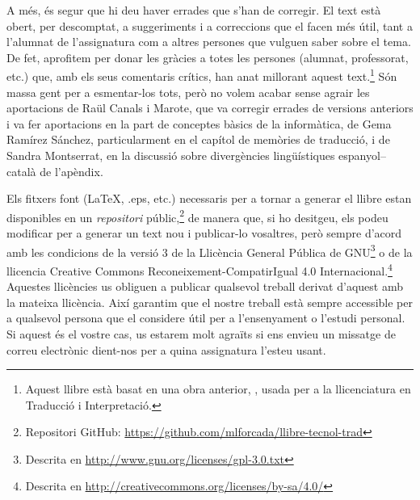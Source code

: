 A més, és segur que hi deu haver errades que s'han de corregir. El
text està obert, per descomptat, a suggeriments i a correccions que el
facen més útil, tant a l'alumnat de l'assignatura com a altres
persones que vulguen saber sobre el tema.  De fet, aprofitem per donar
les gràcies a totes les persones (alumnat, professorat, etc.)  que,
amb els seus comentaris crítics, han anat millorant aquest
text.\footnote{Aquest llibre està basat en una obra anterior,
  \protect\citep{forcada09b}, usada per a la llicenciatura en
  Traducció i Interpretació.}  Són massa gent per a esmentar-los tots,
però no volem acabar sense agrair les aportacions de Raül Canals i
Marote, que va corregir errades de versions anteriors i va fer
aportacions en la part de conceptes bàsics de la informàtica, de Gema
Ramírez Sánchez, particularment en el capítol de memòries de
traducció, i de Sandra Montserrat, en la discussió sobre divergències
lingüístiques espanyol--català de l'apèndix.


Els fitxers font (\LaTeX, .eps, etc.) necessaris per a tornar
a generar el llibre estan disponibles en un \emph{repositori} públic,\footnote{Repositori GitHub: \url{https://github.com/mlforcada/llibre-tecnol-trad}} de manera que, si ho desitgeu, els podeu
modificar per a generar un text nou i publicar-lo vosaltres, però
sempre d'acord amb les condicions de la versió 3 de la Llicència General Pública de
GNU\footnote{Descrita en
\url{http://www.gnu.org/licenses/gpl-3.0.txt}} o de la llicencia
Creative Commons Reconeixement-CompatirIgual 4.0 Internacional.\footnote{Descrita en
\url{http://creativecommons.org/licenses/by-sa/4.0/}} Aquestes
llicències us obliguen a publicar qualsevol treball
derivat d'aquest amb la mateixa llicència. Així garantim que el nostre
treball està sempre accessible per a qualsevol persona que el
considere útil per a l'ensenyament o l'estudi personal. Si aquest és el vostre cas,
us estarem molt agraïts si ens envieu un missatge de correu electrònic dient-nos
per a quina assignatura l'esteu usant.
